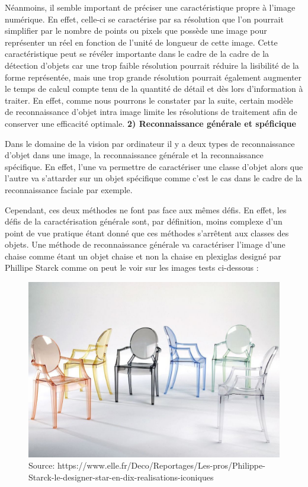 \documentclass[a4paper,12pt]{article} %
\begin{document}
	Néanmoins, il semble important de préciser une caractéristique propre à l’image numérique. En effet, celle-ci se caractérise par sa résolution que l’on pourrait simplifier par le nombre de points ou pixels que possède une image pour représenter un réel en fonction de l’unité de longueur de cette image. Cette caractéristique peut se révéler importante dans le cadre de la cadre de la détection d’objets car une trop faible résolution pourrait réduire la lisibilité de la forme représentée, mais une trop grande résolution pourrait également augmenter le temps de calcul compte tenu de la quantité de détail et dès lors d’information à traiter. En effet, comme nous pourrons le constater par la suite, certain modèle de reconnaissance d’objet intra image limite les résolutions de traitement afin de conserver une efficacité optimale.  
\newpage
\textbf{2) Reconnaissance générale et spéficique}
\newline
\par
	Dans le domaine de la vision par ordinateur il y a deux types de reconnaissance d'objet dans une image, la reconnaissance générale et la reconnaissance spécifique. En effet, l’une va permettre de caractériser une classe d’objet alors que l’autre va s’attarder sur un objet spécifique comme c’est le cas dans le cadre de la reconnaissance faciale par exemple. 
\newline
\par
Cependant, ces deux méthodes ne font pas face aux mêmes défis. En effet, les défis de la caractérisation générale sont, par définition, moins complexe d’un point de vue pratique étant donné que ces méthodes s’arrêtent aux classes des objets. Une méthode de reconnaissance générale va caractériser l’image d’une chaise comme étant un objet chaise et non la chaise en plexiglas designé par Phillipe Starck comme on peut le voir sur les images tests ci-dessous : 
\newline
\begin{figure}[h] %
  \centering %
  \includegraphics[scale=0.2]{stark.jpg} %
  \caption{Source: https://www.elle.fr/Deco/Reportages/Les-pros/Philippe-Starck-le-designer-star-en-dix-realisations-iconiques } %
\end{figure}
\end{document}
